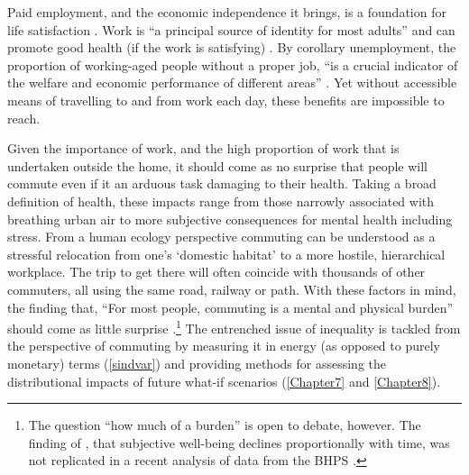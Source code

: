 % 
Paid employment, and the
economic independence it brings, is a foundation for life satisfaction
\citep{Jahoda1982}. Work is ``a principal source of identity for most adults''
\citep{Tausig1999} and can promote good health (if the work is satisfying)
\citep{Graetz1993}. By corollary unemployment, the proportion of working-aged
people without a proper job, ``is a crucial indicator of the welfare and
economic performance of different areas'' \citep[141]{Coombes1982}. Yet without
accessible means of travelling to and from work each day, these benefits are
impossible to reach.

Given the importance of work, and the high proportion of work that is
undertaken outside the home, it should come as no surprise that
people will commute even if it an arduous task damaging to their health.
Taking a broad definition of health, these impacts range from those
narrowly associated with breathing urban air to more subjective consequences for
mental health including stress. From a human ecology perspective
commuting can be understood as a stressful relocation from one's
`domestic habitat' to a more hostile, hierarchical workplace. %
The trip to get there will often coincide with thousands of other
commuters, all using the same road, railway or path. With these factors
in mind, the finding that, ``For most people,
commuting is a mental and physical burden'' should come as little surprise
\citep{Stutzer2007}.\footnote{The question
``how much of a burden'' is open to debate, however.
The finding of \citet{Stutzer2008}, that subjective well-being
declines proportionally with time, was not replicated in a
recent analysis of data from the BHPS \citep{Mumford2012}.}
The entrenched issue of inequality is tackled from
the perspective of commuting by measuring it in energy
(as opposed to purely monetary) terms (\cref{sindvar}) and providing
methods for assessing the distributional impacts of future
what-if scenarios (\cref{Chapter7} and \cref{Chapter8}).

